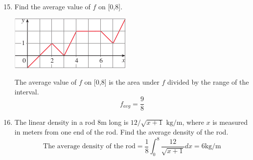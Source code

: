 \documentclass[12pt]{article}
\begin{document}
\begin{enumerate}
\setcounter{enumi}{14}  
    \item Find the average value of $f$ on [0,8].
    \begin{center}
        \includegraphics{img/img-2.png}
    \end{center}
    The average value of $f$ on [0,8] is the area under $f$ divided by the range of the interval.
    \[f_{avg} = \frac{9}{8}\]

\setcounter{enumi}{18}
    \item The linear density in a rod 8m long is $12/\sqrt{x+1} \text{ kg/m}$, where $x$ is measured in meters from one end of the rod. Find the average density of the rod.
    \[\text{The average density of the rod} = \frac{1}{8} \int_0^8 \frac{12}{\sqrt{x+1}}dx = 6\text{kg/m}\]


\end{enumerate}
\end{document}

